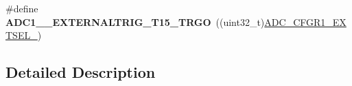 \begin{DoxyCompactItemize}
\item 
\mbox{\label{group___a_d_c___internal___h_a_l__driver___ext__trig__src___regular_ga127cdc8e6c3145ef6b6c447f8a8b6277}} 
\#define {\bfseries A\+D\+C1\+\_\+\_\+\+E\+X\+T\+E\+R\+N\+A\+L\+T\+R\+I\+G\+\_\+\+T15\+\_\+\+T\+R\+GO}~((uint32\+\_\+t)\hyperlink{group___peripheral___registers___bits___definition_gaf417f2e3a6ca8d741d074fc2734e3b9d}{A\+D\+C\+\_\+\+C\+F\+G\+R1\+\_\+\+E\+X\+T\+S\+E\+L\+\_})
\end{DoxyCompactItemize}


\subsection{Detailed Description}
